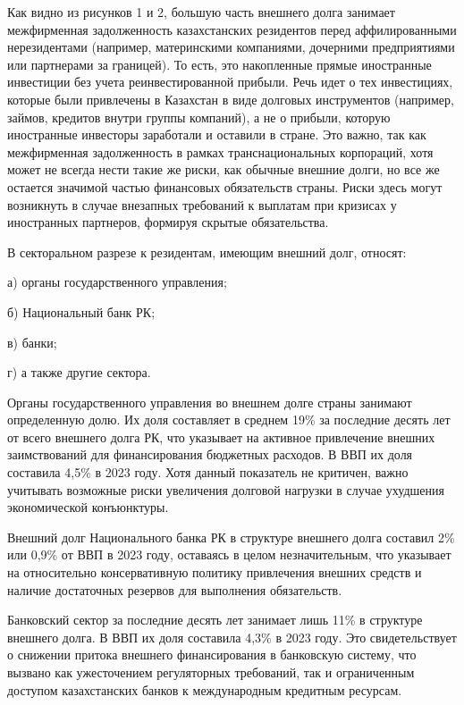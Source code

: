 \begin{multicols}{2}
Как видно из рисунков 1 и 2, большую часть внешнего долга занимает
межфирменная задолженность казахстанских резидентов перед
аффилированными нерезидентами (например, материнскими компаниями,
дочерними предприятиями или партнерами за границей). То есть, это
накопленные прямые иностранные инвестиции без учета реинвестированной
прибыли. Речь идет о тех инвестициях, которые были привлечены в
Казахстан в виде долговых инструментов (например, займов, кредитов
внутри группы компаний), а не о прибыли, которую иностранные инвесторы
заработали и оставили в стране. Это важно, так как межфирменная
задолженность в рамках транснациональных корпораций, хотя может не
всегда нести такие же риски, как обычные внешние долги, но все же
остается значимой частью финансовых обязательств страны. Риски здесь
могут возникнуть в случае внезапных требований к выплатам при кризисах у
иностранных партнеров, формируя скрытые обязательства.

В секторальном разрезе к резидентам, имеющим внешний долг, относят:

а) органы государственного управления;

б) Национальный банк РК;

в) банки;

г) а также другие сектора.

Органы государственного управления во внешнем долге страны занимают
определенную долю. Их доля составляет в среднем 19\% за последние десять
лет от всего внешнего долга РК, что указывает на активное привлечение
внешних заимствований для финансирования бюджетных расходов. В ВВП их
доля составила 4,5\% в 2023 году. Хотя данный показатель не критичен,
важно учитывать возможные риски увеличения долговой нагрузки в случае
ухудшения экономической конъюнктуры.

Внешний долг Национального банка РК в структуре внешнего долга составил
2\% или 0,9\% от ВВП в 2023 году, оставаясь в целом незначительным, что
указывает на относительно консервативную политику привлечения внешних
средств и наличие достаточных резервов для выполнения обязательств.

Банковский сектор за последние десять лет занимает лишь 11\% в структуре
внешнего долга. В ВВП их доля составила 4,3\% в 2023 году. Это
свидетельствует о снижении притока внешнего финансирования в банковскую
систему, что вызвано как ужесточением регуляторных требований, так и
ограниченным доступом казахстанских банков к международным кредитным
ресурсам.


\end{multicols}

